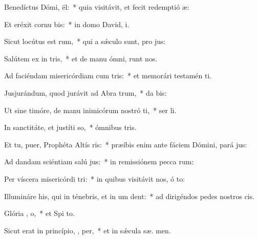 \item Benedíctus Dómi,  ël:~* quia visitávit, et fecit redemptió  æ:
\item Et eréxit cornu  bis:~* in domo David,  i.
\item Sicut locútus est   rum,~* qui a sǽculo sunt, pro jus:
\item Salútem ex in tris,~* et de manu ómni,  runt nos.
\item Ad faciéndam misericórdiam cum  tris:~* et memorári testamén  ti.
\item Jusjurándum, quod jurávit ad Abra  trum,~* da  bis:
\item Ut sine timóre, de manu inimicórum nostró ti,~* ser li.
\item In sanctitáte, et justíti  so,~* ómnibus  tris.
\item Et tu, puer, Prophéta Altís ris:~* præíbis enim ante fáciem Dómini, pará  jus:
\item Ad dandam sciéntiam salú  jus:~* in remissiónem pecca rum:
\item Per víscera misericórdi  tri:~* in quibus visitávit nos, ó  to:
\item Illumináre his, qui in ténebris, et in um  dent:~* ad dirigéndos pedes nostros   cis.
\item Glória ,  o,~* et Spi to.
\item Sicut erat in princípio,  ,  per,~* et in sǽcula sæ. men.
